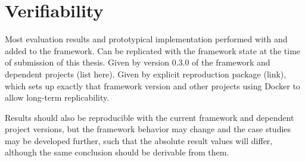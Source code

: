 \chapter{Verifiability}
\label{chap:appendix:verifiability}

Most evaluation results and prototypical implementation performed with and added to the \vitruv framework.
Can be replicated with the framework state at the time of submission of this thesis.
Given by version 0.3.0 of the framework and dependent projects (list here).
Given by explicit reproduction package (link), which sets up exactly that framework version and other projects using Docker to allow long-term replicability.

Results should also be reproducible with the current framework and dependent project versions, but the framework behavior may change and the case studies may be developed further, such that the absolute result values will differ, although the same conclusion should be derivable from them.